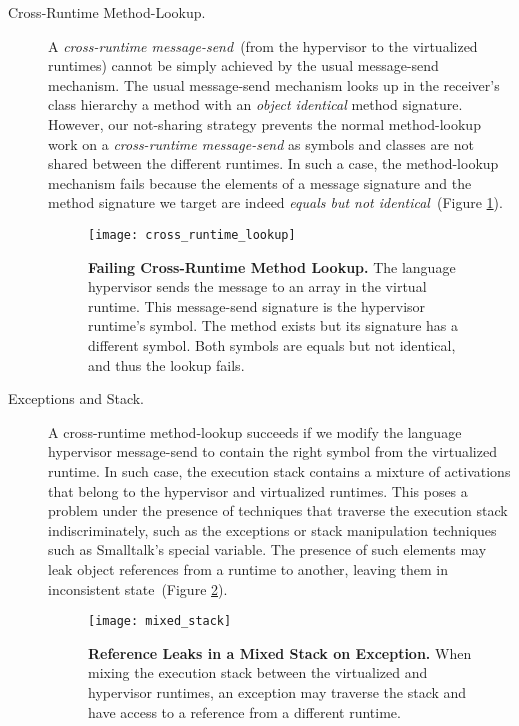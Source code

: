 \begin{description}

\item[Cross-Runtime Method-Lookup.]A \emph{cross-runtime message-send}~(from the hypervisor to the virtualized runtimes) cannot be simply achieved by the usual message-send mechanism. The usual message-send mechanism looks up in the receiver's class hierarchy a method with an \emph{object identical} method signature. However, our not-sharing strategy prevents the normal method-lookup work on a \emph{cross-runtime message-send} as symbols and classes are not shared between the different runtimes. In such a case, the method-lookup mechanism fails because the elements of a message signature and the method signature we target are indeed \emph{equals but not identical}~(Figure \ref{fig:cross_runtime_lookup}).

\begin{figure}[ht]
\center
\texttt{[image: cross\_runtime\_lookup]}
\caption{\textbf{Failing Cross-Runtime Method Lookup.} The language hypervisor sends the  message to an array in the virtual runtime. This message-send signature is the hypervisor runtime's  symbol. The  method exists but its signature has a different  symbol. Both symbols are equals but not identical, and thus the lookup fails.\label{fig:cross_runtime_lookup}}
\end{figure}

\item[Exceptions and Stack.] A cross-runtime method-lookup succeeds if we modify the language hypervisor message-send to contain the right symbol from the virtualized runtime. In such case, the execution stack contains a mixture of activations that belong to the hypervisor and virtualized runtimes. This poses a problem under the presence of techniques that traverse the execution stack indiscriminately, such as the exceptions or stack manipulation techniques such as Smalltalk's  special variable. The presence of such elements may leak object references from a runtime to another, leaving them in inconsistent state~(Figure \ref{fig:mixed_stack}).

\begin{figure}[ht]
\center
\texttt{[image: mixed\_stack]}
\caption{\textbf{Reference Leaks in a Mixed Stack on Exception.} When mixing the execution stack between the virtualized and hypervisor runtimes, an exception may traverse the stack and have access to a reference from a different runtime.\label{fig:mixed_stack}}
\end{figure}

\end{description}

